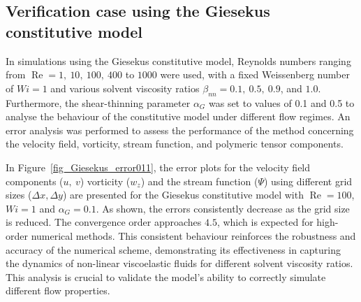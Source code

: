 \documentclass[preprint, 12pt]{elsarticle}
\begin{document}
\subsection{Verification case using the Giesekus constitutive model}
\label{subsec_giesekus}

In simulations using the Giesekus constitutive model, Reynolds numbers ranging
from $\operatorname{Re} = 1,\ 10,\ 100,\ 400$ to $1000$ were used, with a fixed
Weissenberg number of $Wi = 1$ and various solvent viscosity ratios $\beta_{nn}
= 0.1,\ 0.5,\ 0.9$, and $1.0$. Furthermore, the shear-thinning parameter
$\alpha_G$ was set to values of 0.1 and 0.5 to analyse the behaviour of the
constitutive model under different flow regimes. An error analysis was
performed to assess the performance of the method concerning the velocity
field, vorticity, stream function, and polymeric tensor components.

In Figure~\ref{fig_Giesekus_error011}, the error plots for the velocity field
components ($u,~v$) vorticity ($w_z$) and the stream function ($\Psi$) using
different grid sizes ($\Delta x, \Delta y$) are presented for the Giesekus
constitutive model with $\operatorname{Re} = 100$, $Wi = 1$ and $\alpha_G =
0.1$. As shown, the errors consistently decrease as the grid size is reduced.
The convergence order approaches $4.5$, which is expected for high-order
numerical methods. This consistent behaviour reinforces the robustness and
accuracy of the numerical scheme, demonstrating its effectiveness in capturing
the dynamics of non-linear viscoelastic fluids for different solvent viscosity
ratios. This analysis is crucial to validate the model’s ability to correctly
simulate different flow properties.
\end{document}
